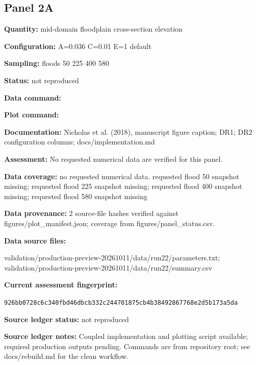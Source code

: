 \subsection*{Panel 2A}
\textbf{Quantity:} mid-domain floodplain cross-section elevation

\textbf{Configuration:} A=0.036 C=0.01 E=1 default

\textbf{Sampling:} floods 50 225 400 580

\textbf{Status:} not reproduced

\textbf{Data command:}\par {\small \texttt{}}\par

\textbf{Plot command:}\par {\small \texttt{}}\par

\textbf{Documentation:} Nicholas et al. (2018), manuscript figure caption; DR1; DR2 configuration columns; docs/\allowbreak{}implementation.md

\textbf{Assessment:} No requested numerical data are verified for this panel.

\textbf{Data coverage:} no requested numerical data. requested flood 50 snapshot missing; requested flood 225 snapshot missing; requested flood 400 snapshot missing; requested flood 580 snapshot missing

\textbf{Data provenance:} 2 source-file hashes verified against figures/\allowbreak{}plot\_\allowbreak{}manifest.json; coverage from figures/\allowbreak{}panel\_\allowbreak{}status.csv.

\textbf{Data source files:}\par {\small\raggedright validation/\allowbreak{}production-preview-20261011/\allowbreak{}data/\allowbreak{}run22/\allowbreak{}parameters.txt; validation/\allowbreak{}production-preview-20261011/\allowbreak{}data/\allowbreak{}run22/\allowbreak{}summary.csv\par}

\textbf{Current assessment fingerprint:}\par {\small\texttt{926bb0728c6c340fbd46dbcb332c244701875cb4b38492867768e2d5b173a5da}}\par

\textbf{Source ledger status:} not reproduced

\textbf{Source ledger notes:} Coupled implementation and plotting script available; required production outputs pending. Commands are from repository root; see docs/\allowbreak{}rebuild.md for the clean workflow.

